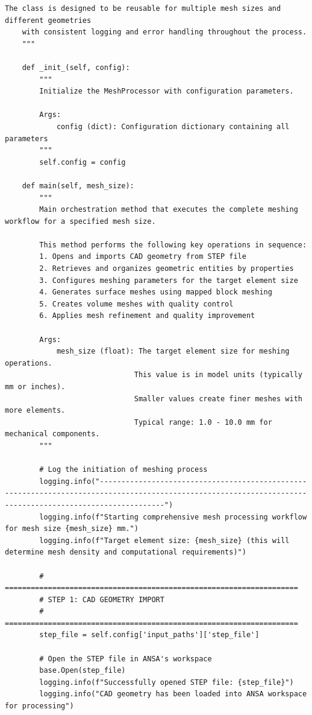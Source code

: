 \documentclass{book}
\begin{document}
\begin{itemize}[leftmargin=*,label=\textbullet]
\begin{itemize}
\begin{lstlisting}[caption={Phase 1 Meshing Automation Script},label={lst:phase1}]
    The class is designed to be reusable for multiple mesh sizes and different geometries
    with consistent logging and error handling throughout the process.
    """

    def _init_(self, config):
        """
        Initialize the MeshProcessor with configuration parameters.
        
        Args:
            config (dict): Configuration dictionary containing all parameters
        """
        self.config = config

    def main(self, mesh_size):
        """
        Main orchestration method that executes the complete meshing workflow for a specified mesh size.
        
        This method performs the following key operations in sequence:
        1. Opens and imports CAD geometry from STEP file
        2. Retrieves and organizes geometric entities by properties
        3. Configures meshing parameters for the target element size
        4. Generates surface meshes using mapped block meshing
        5. Creates volume meshes with quality control
        6. Applies mesh refinement and quality improvement
        
        Args:
            mesh_size (float): The target element size for meshing operations.
                              This value is in model units (typically mm or inches).
                              Smaller values create finer meshes with more elements.
                              Typical range: 1.0 - 10.0 mm for mechanical components.
        """
        
        # Log the initiation of meshing process
        logging.info("-----------------------------------------------------------------------------------------------------------------------------------------------------------")
        logging.info(f"Starting comprehensive mesh processing workflow for mesh size {mesh_size} mm.")
        logging.info(f"Target element size: {mesh_size} (this will determine mesh density and computational requirements)")

        # ====================================================================
        # STEP 1: CAD GEOMETRY IMPORT
        # ====================================================================
        step_file = self.config['input_paths']['step_file']
        
        # Open the STEP file in ANSA's workspace
        base.Open(step_file)
        logging.info(f"Successfully opened STEP file: {step_file}")
        logging.info("CAD geometry has been loaded into ANSA workspace for processing")
        

\end{lstlisting}
\end{itemize}
\end{itemize}
\end{document}
